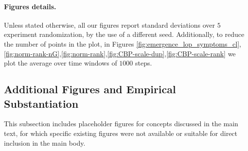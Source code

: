 \documentclass{article}
\numberwithin{figure}{section}
\begin{document}

\paragraph{Figures details.} 
Unless stated otherwise, all our figures report standard deviations over $5$ experiment randomization, by the use of a different seed. Additionally, to reduce the number of points in the plot, in Figures 
\ref{fig:emergence_lop_symptoms_cl},\ref{fig:norm-rank-nG},\ref{fig:norm-rank},\ref{fig:CBP-scale-dup},\ref{fig:CBP-scale-rank} we plot the average over time windows of $1000$ steps. 

\subsection{Additional Figures and Empirical Substantiation}
This subsection includes placeholder figures for concepts discussed in the main text, for which specific existing figures were not available or suitable for direct inclusion in the main body.
\end{document}
